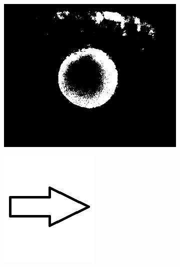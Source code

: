 \documentclass{article}
\begin{document}
\begin{figure}[H]
\begin{subfigure}{.37\textwidth}
  \centering
  \includegraphics[width=0.97\linewidth]{_Figures/raw_data_3_binary.png}
  \caption{}
  \label{fig:raw_3}
\end{subfigure}%
\begin{subfigure}{.09\textwidth}
  \centering
  \includegraphics[width=0.97\linewidth]{_Figures/leftrightarrow.jpg}

\end{subfigure}
\end{figure}
\end{document}
